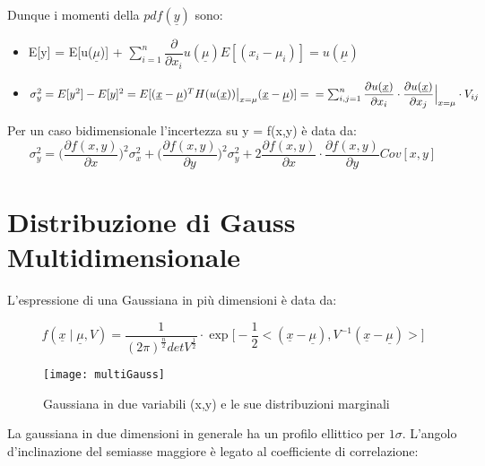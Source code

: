\documentclass[11pt,a4paper]{book}
\begin{document}
\noindent Dunque i momenti della $pdf(\underline{y})$ sono:

\begin{itemize}
	\item E[y] = E[u($\underline{\mu}$)] + $\sum_{i =1}^{n} \dfrac{\partial}{\partial x_{i}}u(\underline{\mu})E[(x_i - \mu_{i})] = u(\underline{\mu}) $
	\item $\sigma_y^2 = E[y^2] - E[y]^2 = E[ (\underline{x} - \underline{\mu})^T H(u(\underline{x}))\big \vert_{x = \mu}(\underline{x} - \underline{\mu})] = \\ \\ =\sum_{i,j =1}^n \dfrac{\partial u(\underline{x})}{\partial x_i} \cdot \dfrac{\partial u(\underline{x})}{\partial x_j}\Big \vert_{x = \mu} \cdot V_{ij}$
\end{itemize}
\vspace{0.1in}
\noindent Per un caso bidimensionale l'incertezza su y = f(x,y) \`{e} data da:
\vspace{0.05in}
\begin{equation}
	\sigma_{y}^2 = \Big (\dfrac{\partial f(x,y)}{\partial x}\Big)^2  \sigma_x^2 + \Big (\dfrac{\partial f(x,y)}{\partial y}\Big)^2  \sigma_y^2 + 2 \dfrac{\partial f(x,y)}{\partial x} \cdot \dfrac{\partial f(x,y)}{\partial y} Cov[x,y]
\end{equation}
\newpage

\section{Distribuzione di Gauss Multidimensionale}


L'espressione di una Gaussiana in pi\`{u} dimensioni \`{e} data da:

\begin{equation}
	f(\underline{x} \; \big \vert \;  \underline{\mu},V) = \dfrac{1}{(2 \pi)^{\frac{n}{2}}detV^{\frac{1}{2}}} \cdot \exp{\Big [-\frac{1}{2} <(\underline{x} - \underline{\mu}),V^{-1}(\underline{x} - \underline{\mu})> \Big ]}
	\end{equation}
	
	
 
\begin{figure}[ht]
\vspace{0.1in}
\texttt{[image: multiGauss]}	
\centering
\vspace{0.1in}
\caption{Gaussiana in due variabili (x,y) e le sue distribuzioni marginali}
\end{figure}

\noindent La gaussiana in due dimensioni in generale ha un profilo ellittico per $1\sigma$. L'angolo d'inclinazione del semiasse maggiore \`{e} legato al coefficiente di correlazione:
\end{document}
